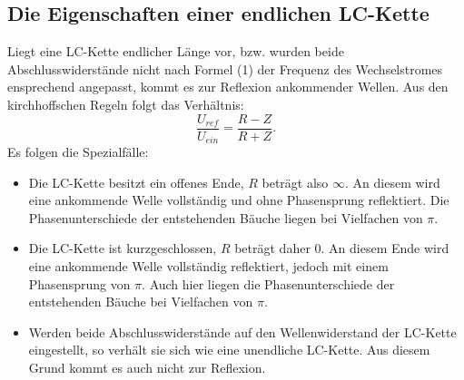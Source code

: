 \subsection{Die Eigenschaften einer endlichen LC-Kette}
Liegt eine LC-Kette endlicher Länge vor, bzw. wurden beide Abschlusswiderstände
 nicht nach Formel (1) der Frequenz des Wechselstromes ensprechend angepasst,
  kommt es zur Reflexion ankommender Wellen. Aus den kirchhoffschen Regeln folgt das Verhältnis:
  \begin{equation}
    \frac{U_{ref}}{U_{ein}} = \frac{R-Z}{R+Z}\text{.}
  \end{equation}
  Es folgen die Spezialfälle:\\
\begin{itemize}
  \item Die LC-Kette besitzt ein offenes Ende, $R$ beträgt also $\infty$. An diesem
   wird eine ankommende Welle vollständig und ohne Phasensprung reflektiert.
   Die Phasenunterschiede der entstehenden Bäuche liegen bei Vielfachen von $\pi$.\\

  \item Die LC-Kette ist kurzgeschlossen, $R$ beträgt daher 0. An diesem Ende wird
   eine ankommende Welle vollständig reflektiert, jedoch mit einem Phasensprung von $\pi$.
   Auch hier liegen die Phasenunterschiede der entstehenden Bäuche bei Vielfachen von $\pi$.\\

 \item Werden beide Abschlusswiderstände auf den Wellenwiderstand der LC-Kette eingestellt,
  so verhält sie sich wie eine unendliche LC-Kette. Aus diesem Grund kommt es auch nicht zur Reflexion.
\end{itemize}
